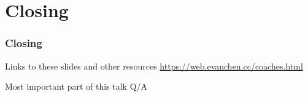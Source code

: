 \documentclass[10pt]{beamer}
\begin{document}
\section{Closing}
\begin{frame}
  \frametitle{Closing}
  \begin{exampleblock}{Links to these slides and other resources}
    \url{https://web.evanchen.cc/coaches.html}
  \end{exampleblock}
  \bigskip
  \pause
  \begin{block}{Most important part of this talk}
    \LARGE\centering Q/A
  \end{block}
\end{frame}
\end{document}

